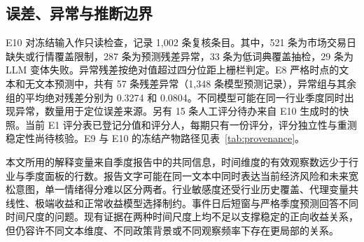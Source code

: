 \subsection{误差、异常与推断边界}

E10 对冻结输入作只读检查，记录 1,002 条复核条目。其中，521 条为市场交易日缺失或行情覆盖限制，287 条为预测残差异常，33 条为低词典覆盖抽检，29 条为 LLM 变体失败。异常残差按绝对值超过四分位距上栅栏判定。E8 严格时点的文本和无文本预测中，共有 57 条残差异常（1,348 条模型预测记录），异常组与其余组的平均绝对残差分别为 0.3274 和 0.0804。不同模型可能在同一行业季度同时出现异常，数量用于定位误差来源。另有 15 条人工评分待办来自 E10 生成时的快照。当前 E1 评分表已登记分值和评分人，每期只有一份评分，评分独立性与重测稳定性尚待核验。E9 与 E10 的冻结产物路径见表~\ref{tab:provenance}。

本文所用的解释变量来自季度报告中的共同信息，时间维度的有效观察数远少于行业与季度面板的行数。报告文字可能在同一文本中同时表达当前经济风险和未来宽松意图，单一情绪得分难以区分两者。行业敏感度还受行业历史覆盖、代理变量共线性、极端收益和正常收益模型选择制约。事件日后短窗与严格季度预测回答不同时间尺度的问题。现有证据在两种时间尺度上均不足以支撑稳定的正向收益关系，但仍容许不同文本维度、不同政策背景或不同观察频率下存在更局部的关系。
